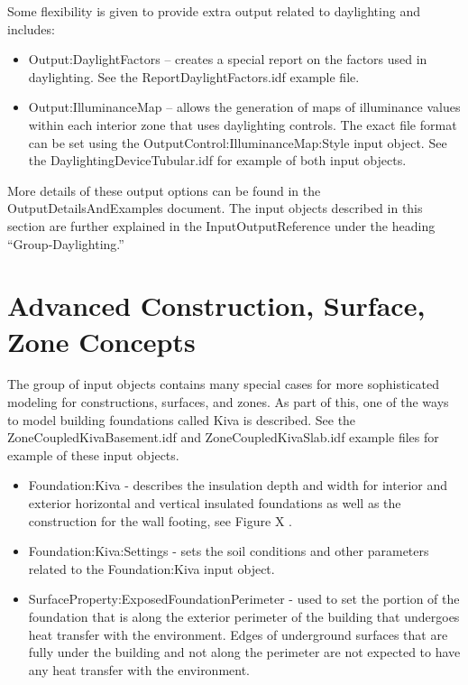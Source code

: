 Some flexibility is given to provide extra output related to daylighting
and includes: 
\begin{itemize}
\item Output:DaylightFactors -- creates a special report on the factors
used in daylighting. See the ReportDaylightFactors.idf example file.
\item Output:IlluminanceMap -- allows the generation of maps of illuminance
values within each interior zone that uses daylighting controls. The
exact file format can be set using the OutputControl:IlluminanceMap:Style
input object. See the DaylightingDeviceTubular.idf for example of
both input objects.
\end{itemize}
More details of these output options can be found in the OutputDetailsAndExamples
document. The input objects described in this section are further
explained in the InputOutputReference under the heading ``Group-Daylighting.''

\section{Advanced Construction, Surface, Zone Concepts}

The group of input objects contains many special cases for more sophisticated
modeling for constructions, surfaces, and zones. As part of this,
one of the ways to model building foundations called Kiva is described.
See the ZoneCoupledKivaBasement.idf and ZoneCoupledKivaSlab.idf example
files for example of these input objects.
\begin{itemize}
\item Foundation:Kiva - describes the insulation depth and width for interior
and exterior horizontal and vertical insulated foundations as well
as the construction for the wall footing, see Figure X .
\item Foundation:Kiva:Settings - sets the soil conditions and other parameters
related to the Foundation:Kiva input object.
\item SurfaceProperty:ExposedFoundationPerimeter - used to set the portion
of the foundation that is along the exterior perimeter of the building
that undergoes heat transfer with the environment. Edges of underground
surfaces that are fully under the building and not along the perimeter
are not expected to have any heat transfer with the environment.
\end{itemize}

